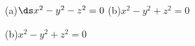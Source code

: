 {\begin{minipage}[m]{\linewidth}
\centering
{}

(a)\quad $\ds x^2-y^2-z^2=0$ \qquad\qquad (b)\quad $x^2-y^2+z^2=0$
\end{minipage}
}
{(b)\quad $x^2-y^2+z^2=0$
}
